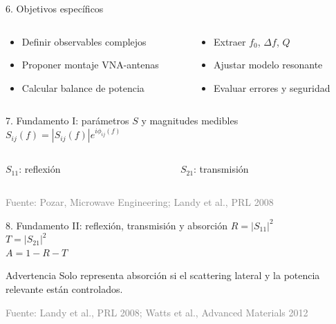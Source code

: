 \documentclass[aspectratio=169]{beamer}
\newcommand{\rubrica}[2]{\vspace{0.1cm}{\scriptsize\textcolor{deepblue}{Rúbrica #1 · #2}}}
\newcommand{\fuente}[1]{\vfill{\tiny\textcolor{gray}{Fuente: #1}}}
\begin{document}
\begin{frame}{6. Objetivos específicos}
  \Large
  \begin{columns}[T]
    \begin{column}{0.48\textwidth}
      \begin{itemize}
        \item Definir observables complejos
        \item Proponer montaje VNA-antenas
        \item Calcular balance de potencia
      \end{itemize}
    \end{column}
    \begin{column}{0.48\textwidth}
      \begin{itemize}
        \item Extraer \(f_0\), \(\Delta f\), \(Q\)
        \item Ajustar modelo resonante
        \item Evaluar errores y seguridad
      \end{itemize}
    \end{column}
  \end{columns}
  \rubrica{2}{15\% de la evaluación}
\end{frame}

\begin{frame}{7. Fundamento I: parámetros \(S\) y magnitudes medibles}
  \centering
  {\Huge\(S_{ij}(f)=|S_{ij}(f)|e^{i\phi_{ij}(f)}\)}

  \vfill
  \begin{columns}[T]
    \begin{column}{0.45\textwidth}
      \centering\Large \(S_{11}\): reflexión
    \end{column}
    \begin{column}{0.45\textwidth}
      \centering\Large \(S_{21}\): transmisión
    \end{column}
  \end{columns}
  \fuente{Pozar, Microwave Engineering; Landy et al., PRL 2008}
  \rubrica{3}{Fundamento teórico detallado}
\end{frame}

\begin{frame}{8. Fundamento II: reflexión, transmisión y absorción}
  \centering
  {\Huge\(R=|S_{11}|^2\)}\\[0.25cm]
  {\Huge\(T=|S_{21}|^2\)}\\[0.25cm]
  {\Huge\(A=1-R-T\)}

  \vfill
  \begin{block}{Advertencia}
    \centering
    Solo representa absorción si el scattering lateral y la potencia relevante están controlados.
  \end{block}
  \fuente{Landy et al., PRL 2008; Watts et al., Advanced Materials 2012}
  \rubrica{3}{Balance de potencia}
\end{frame}
\end{document}
